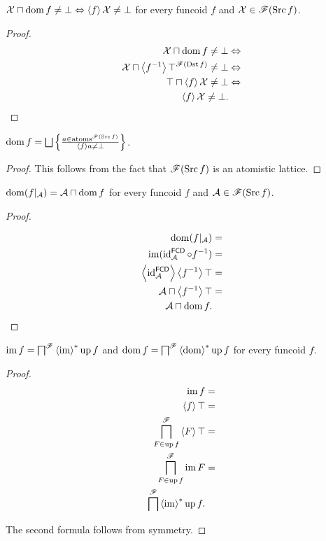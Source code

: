 \begin{prop}\label{x-dom-fcd}
$\mathcal{X}\sqcap\operatorname{dom} f\ne\bot\Leftrightarrow\left\langle f\right\rangle\mathcal{X}\ne\bot$
for every funcoid $f$ and $\mathcal{X}\in\mathscr{F}(\operatorname{Src} f)$.\end{prop}
\begin{proof}
~
\begin{align*}
\mathcal{X}\sqcap\operatorname{dom} f\ne\bot & \Leftrightarrow\\
\mathcal{X}\sqcap\left\langle f^{-1}\right\rangle\top^{\mathscr{F}(\operatorname{Dst}
f)}\ne\bot & \Leftrightarrow\\
\top\sqcap\left\langle f\right\rangle\mathcal{X}\ne\bot & \Leftrightarrow\\
\left\langle f\right\rangle\mathcal{X}\ne\bot.
\end{align*}
\end{proof}
\begin{cor}\label{dom-fcd-at}
$\dom f=\bigsqcup\setcond{a\in\atoms^{\mathscr{F}(\Src f)}}{\supfun
fa\ne\bot}$.\end{cor}
\begin{proof}
This follows from the fact that $\mathscr{F}(\operatorname{Src} f)$ is an atomistic
lattice.\end{proof}
\begin{prop}
$\operatorname{dom}(f|_{\mathcal{A}})=\mathcal{A}\sqcap\operatorname{dom} f$ for every funcoid
$f$ and $\mathcal{A}\in\mathscr{F}(\operatorname{Src} f)$.\end{prop}
\begin{proof}
~

\begin{align*}
\operatorname{dom}(f|_{\mathcal{A}}) & =\\
\operatorname{im}(\operatorname{id}_{\mathcal{A}}^{\mathsf{FCD}}\circ f^{-1}) & =\\
\left\langle \operatorname{id}_{\mathcal{A}}^{\mathsf{FCD}}\right\rangle\left\langle f^{-1}\right\rangle\top & =\\
\mathcal{A}\sqcap\left\langle f^{-1}\right\rangle\top & =\\
\mathcal{A}\sqcap\operatorname{dom} f.
\end{align*}
\end{proof}
\begin{thm}
$\operatorname{im} f=\bigsqcap^{\mathscr{F}}\left\langle \operatorname{im}\right\rangle ^{\ast}\operatorname{up} f$ and $\operatorname{dom}
f=\bigsqcap^{\mathscr{F}}\left\langle \operatorname{dom}\right\rangle ^{\ast}\operatorname{up} f$
for every funcoid $f$.\end{thm}
\begin{proof}
~
\begin{align*}
\operatorname{im} f & =\\
\left\langle f\right\rangle\top & =\\
\bigsqcap_{F\in\operatorname{up} f}^{\mathscr{F}}\left\langle F\right\rangle\top & =\\
\bigsqcap_{F\in\operatorname{up} f}^{\mathscr{F}}\operatorname{im} F & =\\
\bigsqcap^{\mathscr{F}}\left\langle \operatorname{im}\right\rangle ^{\ast}\operatorname{up} f.
\end{align*}


The second formula follows from symmetry.\end{proof}
